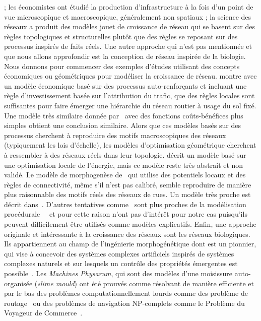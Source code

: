 {; les économistes ont étudié la production d'infrastructure à la fois d'un point de vue microscopique et macroscopique, généralement non spatiaux ; la science des réseaux a produit des modèles jouet de croissance de réseau qui se basent sur des règles topologiques et structurelles plutôt que des règles se reposant sur des processus inspirés de faits réels. Une autre approche qui n'est pas mentionnée et que nous allons approfondir est la conception de réseau inspirée de la biologie. Nous donnons pour commencer des exemples d'études utilisant des concepts économiques ou géométriques pour modéliser la croissance de réseau. \cite{yerra2005emergence} montre avec un modèle économique basé sur des processus auto-renforçants et incluant une règle d'investissement basée sur l'attribution du trafic, que des règles locales sont suffisantes pour faire émerger une hiérarchie du réseau routier à usage du sol fixé. Une modèle très similaire donnée par~\cite{louf2013emergence} avec des fonctions coûts-bénéfices plus simples obtient une conclusion similaire. 
Alors que ces modèles basés sur des processus cherchent à reproduire des motifs macroscopiques des réseaux (typiquement les lois d'échelle), les modèles d'optimisation géométrique cherchent à ressembler à des réseaux réels dans leur topologie. \cite{barthelemy2008modeling} décrit un modèle basé sur une optimisation locale de l'énergie, mais ce modèle reste très abstrait et non validé. Le modèle de morphogenèse de~\cite{courtat2011mathematics} qui utilise des potentiels locaux et des règles de connectivité, même s'il n'est pas calibré, semble reproduire de manière plus raisonnable des motifs réels des réseaux de rues. Un modèle très proche est décrit dans~\cite{rui2013exploring}.
D'autres tentatives comme~\cite{de2007netlogo,yamins2003growing} sont plus proches de la modélisation procédurale~~\cite{lechner2004procedural,watson2008procedural} et pour cette raison n'ont pas d'intérêt pour notre cas puisqu'ils peuvent difficilement être utilisés comme modèles explicatifs. Enfin, une approche originale et intéressante à la croissance des réseaux sont les réseaux biologiques. Ils appartiennent au champ de l'ingénierie morphogénétique dont  est un pionnier, qui vise à concevoir des systèmes complexes artificiels inspirés de systèmes complexes naturels et sur lesquels un contrôle des propriétés émergentes est possible~\cite{doursat2012morphogenetic}. Les \emph{Machines Physarum}, qui sont des modèles d'une moisissure auto-organisée (\emph{slime mould}) ont été prouvés comme résolvant de manière efficiente et par le bas des problèmes computationnellement lourds comme des problème de routage~\cite{tero2006physarum} ou des problèmes de navigation NP-complets comme le Problème du Voyageur de Commerce~\cite{zhu2013amoeba}. 
}
